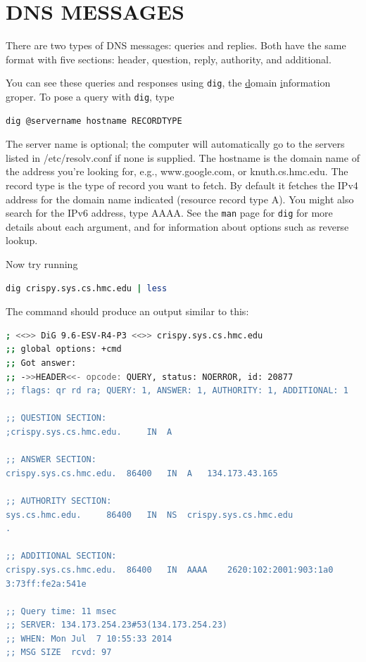 \documentclass[11pt,a4paper]{article}
\begin{document}
\section{DNS MESSAGES}
\indent \indent There are two types of DNS messages: queries and replies.
Both have the same format with five sections: header, question, reply, authority, and additional. 

You can see these queries and responses using \verb|dig|, the \underline domain \underline information \underline groper. 
\newpage
To pose a query with \verb|dig|, type
\begin{lstlisting}[basicstyle=\ttfamily, backgroundcolor = \color{lightgray}, language = bash, xleftmargin = 0cm, framexleftmargin = 1em]
dig @servername hostname RECORDTYPE
\end{lstlisting}
The server name is optional; the computer will automatically go to the servers listed in /etc/resolv.conf if none is supplied.
The hostname is the domain name of the address you're looking for, e.g., www.google.com, or knuth.cs.hmc.edu.
The record type is the type of record you want to fetch. 
By default it fetches the IPv4 address for the domain name indicated (resource record type A).
You might also search for the IPv6 address, type AAAA.
See the \verb|man| page for \verb|dig| for more details about each argument, and for information about options such as reverse lookup. 

Now try running 
\begin{lstlisting}[basicstyle=\ttfamily, backgroundcolor = \color{lightgray}, language = bash, xleftmargin = 0cm, framexleftmargin = 1em]
dig crispy.sys.cs.hmc.edu | less
\end{lstlisting}

The command should produce an output similar to this:
\begin{lstlisting}[basicstyle=\ttfamily, backgroundcolor = \color{lightgray}, language = bash, xleftmargin = 0cm, framexleftmargin = 1em]
; <<>> DiG 9.6-ESV-R4-P3 <<>> crispy.sys.cs.hmc.edu
;; global options: +cmd
;; Got answer:
;; ->>HEADER<<- opcode: QUERY, status: NOERROR, id: 20877
;; flags: qr rd ra; QUERY: 1, ANSWER: 1, AUTHORITY: 1, ADDITIONAL: 1

;; QUESTION SECTION:
;crispy.sys.cs.hmc.edu.		IN	A

;; ANSWER SECTION:
crispy.sys.cs.hmc.edu.	86400	IN	A	134.173.43.165

;; AUTHORITY SECTION:
sys.cs.hmc.edu.		86400	IN	NS	crispy.sys.cs.hmc.edu
.

;; ADDITIONAL SECTION:
crispy.sys.cs.hmc.edu.	86400	IN	AAAA	2620:102:2001:903:1a0
3:73ff:fe2a:541e

;; Query time: 11 msec
;; SERVER: 134.173.254.23#53(134.173.254.23)
;; WHEN: Mon Jul  7 10:55:33 2014
;; MSG SIZE  rcvd: 97
\end{lstlisting}
\end{document}
